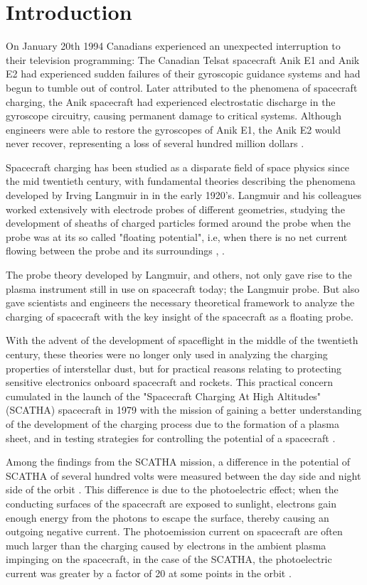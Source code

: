 \chapter{Introduction}
\label{sec:intro}

On January 20th 1994 Canadians experienced an unexpected interruption to their television programming: The Canadian Telsat spacecraft Anik E1 and Anik E2 had experienced sudden failures of their gyroscopic guidance systems and had begun to tumble out of control. Later attributed to the phenomena of spacecraft charging, the Anik spacecraft had experienced electrostatic discharge in the gyroscope circuitry, causing permanent damage to critical systems. Although engineers were able to restore the gyroscopes of Anik E1, the Anik E2 would never recover, representing a loss of several hundred million dollars \parencite{Leach1995}.

Spacecraft charging has been studied as a disparate field of space physics since the mid twentieth century, with fundamental theories describing the phenomena developed by Irving Langmuir in in the early 1920's. Langmuir and his colleagues worked extensively with electrode probes of different geometries, studying the development of sheaths of charged particles formed around the probe when the probe was at its so called "floating potential", i.e, when there is no net current flowing between the probe and its surroundings \parencite{Mott-Smith1926}, \parencite{Garrett1981}. 

The probe theory developed by Langmuir, and others, not only gave rise to the plasma instrument still in use on spacecraft today; the Langmuir probe. But also gave scientists and engineers the necessary theoretical framework to analyze the charging of spacecraft with the key insight of the spacecraft as a floating probe. 

With the advent of the development of spaceflight in the middle of the twentieth century, these theories were no longer only used in analyzing the charging properties of interstellar dust, but for practical reasons relating to protecting sensitive electronics onboard spacecraft and rockets. This practical concern cumulated in the launch of the "Spacecraft Charging At High Altitudes" (SCATHA) spacecraft in 1979 with the mission of gaining a better understanding of the development of the charging process due to the formation of a plasma sheet, and in testing strategies for controlling the potential of a spacecraft \parencite{SCATHA2020}. 

Among the findings from the SCATHA mission, a difference in the potential of SCATHA of several hundred volts were measured between the day side and night side of the orbit \parencite{Mullen1986}. This difference is due to the photoelectric effect; when the conducting surfaces of the spacecraft are exposed to sunlight, electrons gain enough energy from the photons to escape the surface, thereby causing an outgoing negative current. The photoemission current on spacecraft are often much larger than the charging caused by electrons in the ambient plasma impinging on the spacecraft, in the case of the SCATHA, the photoelectric current was greater by a factor of 20 at some points in the orbit \parencite{LAI2019}.  


